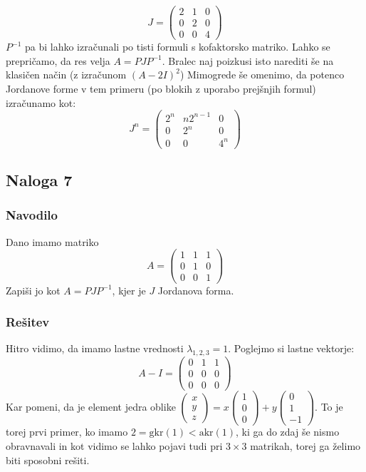 \documentclass{article}
\begin{document}
\begin{equation*}
J = 
\begin{pmatrix}
2 & 1 & 0 \\
0 & 2 & 0 \\
0 & 0 & 4
\end{pmatrix}
\end{equation*}
$P^{-1}$ pa bi lahko izračunali po tisti formuli s kofaktorsko matriko.
Lahko se prepričamo, da res velja $A = P J P^{-1}$. Bralec naj poizkusi isto narediti še na klasičen način (z izračunom $(A-2I)^2$)
Mimogrede še omenimo, da potenco Jordanove forme v tem primeru (po blokih z uporabo prejšnjih formul) izračunamo kot:
\begin{equation*}
J^n = 
\begin{pmatrix}
2^n & n 2^{n-1} & 0 \\
0 & 2^n & 0 \\
0 & 0 & 4^n
\end{pmatrix}
\end{equation*}

\subsection*{Naloga 7}
\subsubsection*{Navodilo}
Dano imamo matriko
\begin{equation*}
A =
\begin{pmatrix}
1 & 1 & 1 \\
0 & 1 & 0 \\
0 & 0 & 1
\end{pmatrix}
\end{equation*}
Zapiši jo kot $A=P J P^{-1}$, kjer je $J$ Jordanova forma.
\subsubsection*{Rešitev}
Hitro vidimo, da imamo lastne vrednosti $\lambda_{1,2,3} = 1$.
Poglejmo si lastne vektorje:
\begin{equation*}
A-I = 
\begin{pmatrix}
0 & 1 & 1 \\
0 & 0 & 0 \\
0 & 0 & 0
\end{pmatrix}
\end{equation*}
Kar pomeni, da je element jedra oblike $\begin{pmatrix} x \\ y \\ z \end{pmatrix} = x \begin{pmatrix} 1 \\ 0 \\ 0 \end{pmatrix} + y \begin{pmatrix} 0 \\ 1 \\ -1 \end{pmatrix}$.
To je torej prvi primer, ko imamo $2 = \mathrm{gkr}(1) < \mathrm{akr}(1)$, ki ga do zdaj še nismo obravnavali in kot vidimo se lahko pojavi tudi pri $3 \times 3$ matrikah, torej ga želimo biti sposobni rešiti.
\end{document}
